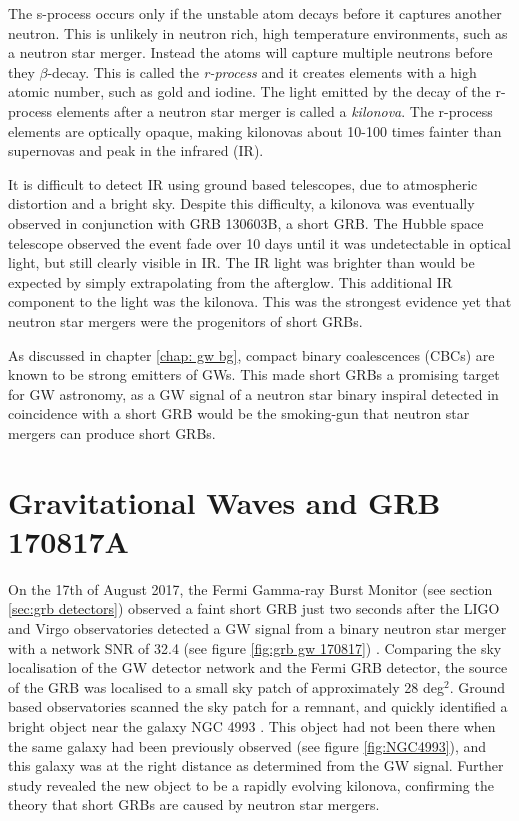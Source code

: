 \documentclass[11pt]{cuthesis}
\begin{document}
The s-process occurs only if the unstable atom decays before it captures another neutron. This is unlikely in neutron rich, high temperature environments, such as a neutron star merger. Instead the atoms will capture multiple neutrons before they $\beta$-decay. This is called the \textit{r-process} and it creates elements with a high atomic number, such as gold and iodine. The light emitted by the decay of the r-process elements after a neutron star merger is called a \textit{kilonova}. The r-process elements are optically opaque, making kilonovas about 10-100 times fainter than supernovas and peak in the infrared (IR). 

It is difficult to detect IR using ground based telescopes, due to atmospheric distortion and a bright sky. Despite this difficulty, a kilonova was eventually observed in conjunction with GRB 130603B, a short GRB. The Hubble space telescope observed the event fade over 10 days until it was undetectable in optical light, but still clearly visible in IR. The IR light was brighter than would be expected by simply extrapolating from the afterglow. This additional IR component to the light was the kilonova. This was the strongest evidence yet that neutron star mergers were the progenitors of short GRBs. 

As discussed in chapter \ref{chap: gw bg}, compact binary coalescences (CBCs) are known to be strong emitters of GWs. This made short GRBs a promising target for GW astronomy, as a GW signal of a neutron star binary inspiral detected in coincidence with a short GRB would be the smoking-gun that neutron star mergers can produce short GRBs. 

\section{Gravitational Waves and GRB 170817A} \label{sec:gw170817} 
On the 17th of August 2017, the Fermi Gamma-ray Burst Monitor (see section \ref{sec:grb detectors}) observed a faint short GRB just two seconds after the LIGO and Virgo observatories detected a GW signal from a binary neutron star merger with a network SNR of 32.4 (see figure \ref{fig:grb gw 170817}) \cite{GW170817_det}. Comparing the sky localisation of the GW detector network and the Fermi GRB detector, the source of the GRB was localised to a small sky patch of approximately 28 deg$^2$. Ground based observatories scanned the sky patch for a remnant, and quickly identified a bright object near the galaxy NGC 4993 \cite{GW170817_GRB}. This object had not been there when the same galaxy had been previously observed (see figure \ref{fig:NGC4993}), and this galaxy was at the right distance as determined from the GW signal. Further study revealed the new object to be a rapidly evolving kilonova, confirming the theory that short GRBs are caused by neutron star mergers. 
\end{document}
